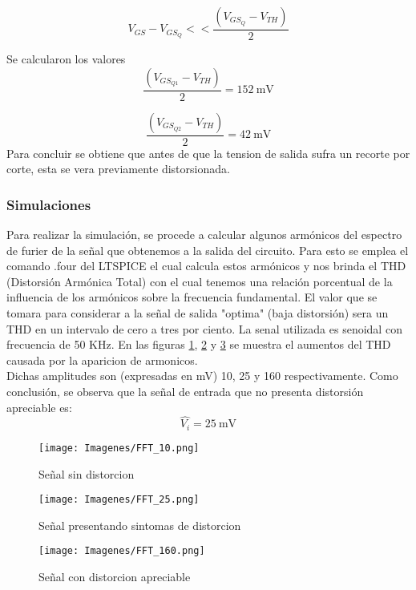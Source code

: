 \documentclass[a4paper,10pt]{article}
\begin{document}
				\begin{displaymath}
					V_{GS}-V_{GS_Q}<< \frac{(V_{GS_Q}-V_{TH})}{2}
				\end{displaymath}

				Se calcularon los valores
				\begin{displaymath}
					\frac{(V_{GS_{Q1}}-V_{TH})}{2}=152~\text{mV}
				\end{displaymath}

				\begin{displaymath}
					\frac{(V_{GS_{Q2}}-V_{TH})}{2}=42~\text{mV}
				\end{displaymath}
				Para concluir se obtiene que antes de que la tension de salida sufra un recorte por corte, esta se vera previamente distorsionada.						
			\subsubsection{Simulaciones}		
			Para realizar la simulación, se procede a calcular algunos armónicos del espectro de furier de la señal que obtenemos a la salida del circuito. Para esto se emplea el comando .four del LTSPICE el cual calcula estos armónicos y nos brinda el THD (Distorsión Armónica Total) con el cual tenemos una relación porcentual de la influencia de los armónicos sobre la frecuencia fundamental.
			El valor que se tomara para considerar a la señal de salida "optima" (baja distorsión) sera un THD en un intervalo de cero a tres por ciento. 
			\indent La senal utilizada es senoidal con frecuencia de 50 KHz. En las figuras \ref{pimg001}, \ref{pimg002} y \ref{pimg003} se muestra el aumentos del THD causada por la aparicion de armonicos. \\
			\indent Dichas amplitudes son (expresadas en mV) 10, 25 y 160 respectivamente. Como conclusión, se observa que la señal de entrada que no presenta 
			distorsión apreciable es:
				\begin{displaymath}
					\hat{V_i} =25~\text{mV}
				\end{displaymath}
					
			\begin{figure}[!htb]
					\centering
						\texttt{[image: Imagenes/FFT\_10.png]}
						\caption{Se\~{n}al sin distorcion} \label{pimg001}
				\end{figure}
			\begin{figure}[!htb]
					\centering
						\texttt{[image: Imagenes/FFT\_25.png]}
						\caption{Se\~{n}al presentando sintomas de distorcion} \label{pimg002}
				\end{figure}
			\begin{figure}[!htb]
					\centering
						\texttt{[image: Imagenes/FFT\_160.png]}
						\caption{Se\~{n}al con distorcion apreciable} \label{pimg003}
				\end{figure}
\end{document}
